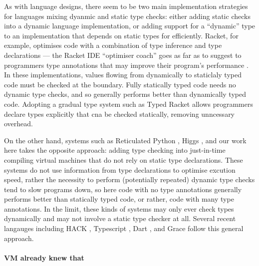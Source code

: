As with language designs, there seem to be two main implementation
strategies for languages mixing dyanmic and static type checks: either
adding static checks into a dynamic language implementation, or adding
support for a ``dynamic'' type to an implementation that depends on
static types for efficiently. Racket, for example, optimises code with
a combination of type inference and type declarations --- the Racket
IDE ``optimiser coach'' goes as far as to suggest to programmers type
annotations that may improve their program's performance
\cite{ShriramOptimiserCoach}. In these implementations, values flowing
from dynamically to staticlaly typed code must be checked at the
boundary.  Fully statically typed code needs no dynamic type checks,
and so generally performs better than dynamically typed code. Adopting
a gradual type system such as Typed Racket \cite{TypedRacket} allows
programmers declare types explicitly that cna be checked statically,
removing unncessary overhead.

On the other hand, systems such as Reticulated Python
\cite{ReticulatedPython}, Higgs \cite{VM-aready-knew-that}, and our
work here takes the opposite approach: adding type checking into
just-in-time compiling virtual machines that do not rely on static
type declarations. These systems do not use information from type
declarations to optimise excution speed, rather the necessity to
perform (potentially repeated) dynamic type checks tend to slow
programs down, so here code with no type annotations generally
performs better than statically typed code, or rather, code with many
type annotations. In the limit, these kinds of systems may only ever
check types dynamically and may not involve a static type checker at
all.  Several recent langauges including HACK \cite{HACK}, Typescript
\cite{typescript}, Dart \cite{dart}, and Grace \cite{grace} follow
this general approach.





 




\paragraph{VM already knew that}

